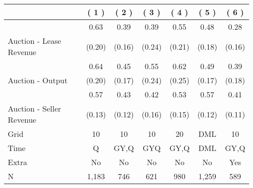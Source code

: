 
\begin{tabular}{lcccccc}
\toprule
  & ( 1 ) & ( 2 ) & ( 3 ) & ( 4 ) & ( 5 ) & ( 6 )\\
\midrule
 & 0.63 & 0.39 & 0.39 & 0.55 & 0.48 & 0.28\\

\multirow{-2}{*}{\raggedright\arraybackslash Auction - Lease Revenue} & (0.20) & (0.16) & (0.24) & (0.21) & (0.18) & (0.16)\\

\midrule
 & 0.64 & 0.45 & 0.55 & 0.62 & 0.49 & 0.39\\

\multirow{-2}{*}{\raggedright\arraybackslash Auction - Output} & (0.20) & (0.17) & (0.24) & (0.25) & (0.17) & (0.18)\\

\midrule
 & 0.57 & 0.43 & 0.42 & 0.53 & 0.57 & 0.41\\

\multirow{-2}{*}{\raggedright\arraybackslash Auction - Seller Revenue} & (0.13) & (0.12) & (0.16) & (0.15) & (0.12) & (0.11)\\

\midrule
Grid & 10 & 10 & 10 & 20 & DML & 10\\

Time & Q & GY,Q & GYQ & GY,Q & DML & GY,Q\\

Extra & No & No & No & No & No & Yes\\

N & 1,183 & 746 & 621 & 980 & 1,259 & 589\\
\bottomrule
\end{tabular}
